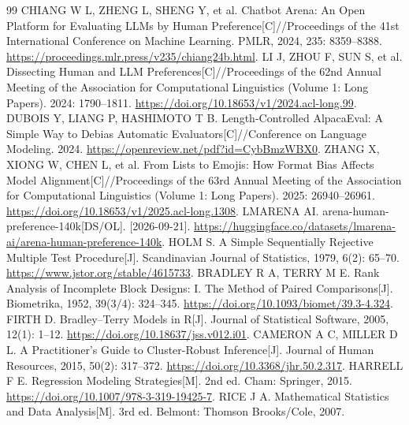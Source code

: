 \documentclass[UTF8,11pt,a4paper,fontset=windows]{ctexart}
\numberwithin{equation}{section}
\begin{document}
\begin{thebibliography}{99}\small
{} CHIANG W L, ZHENG L, SHENG Y, et al. Chatbot Arena: An Open Platform for Evaluating LLMs by Human Preference[C]//Proceedings of the 41st International Conference on Machine Learning. PMLR, 2024, 235: 8359--8388. \url{https://proceedings.mlr.press/v235/chiang24b.html}.
 LI J, ZHOU F, SUN S, et al. Dissecting Human and LLM Preferences[C]//Proceedings of the 62nd Annual Meeting of the Association for Computational Linguistics (Volume 1: Long Papers). 2024: 1790--1811. \url{https://doi.org/10.18653/v1/2024.acl-long.99}.
 DUBOIS Y, LIANG P, HASHIMOTO T B. Length-Controlled AlpacaEval: A Simple Way to Debias Automatic Evaluators[C]//Conference on Language Modeling. 2024. \url{https://openreview.net/pdf?id=CybBmzWBX0}.
 ZHANG X, XIONG W, CHEN L, et al. From Lists to Emojis: How Format Bias Affects Model Alignment[C]//Proceedings of the 63rd Annual Meeting of the Association for Computational Linguistics (Volume 1: Long Papers). 2025: 26940--26961. \url{https://doi.org/10.18653/v1/2025.acl-long.1308}.
 LMARENA AI. arena-human-preference-140k[DS/OL]. [2026-09-21]. \url{https://huggingface.co/datasets/lmarena-ai/arena-human-preference-140k}.
 HOLM S. A Simple Sequentially Rejective Multiple Test Procedure[J]. Scandinavian Journal of Statistics, 1979, 6(2): 65--70. \url{https://www.jstor.org/stable/4615733}.
 BRADLEY R A, TERRY M E. Rank Analysis of Incomplete Block Designs: I. The Method of Paired Comparisons[J]. Biometrika, 1952, 39(3/4): 324--345. \url{https://doi.org/10.1093/biomet/39.3-4.324}.
 FIRTH D. Bradley--Terry Models in R[J]. Journal of Statistical Software, 2005, 12(1): 1--12. \url{https://doi.org/10.18637/jss.v012.i01}.
 CAMERON A C, MILLER D L. A Practitioner's Guide to Cluster-Robust Inference[J]. Journal of Human Resources, 2015, 50(2): 317--372. \url{https://doi.org/10.3368/jhr.50.2.317}.
 HARRELL F E. Regression Modeling Strategies[M]. 2nd ed. Cham: Springer, 2015. \url{https://doi.org/10.1007/978-3-319-19425-7}.
 RICE J A. Mathematical Statistics and Data Analysis[M]. 3rd ed. Belmont: Thomson Brooks/Cole, 2007.
\end{thebibliography}
\end{document}
